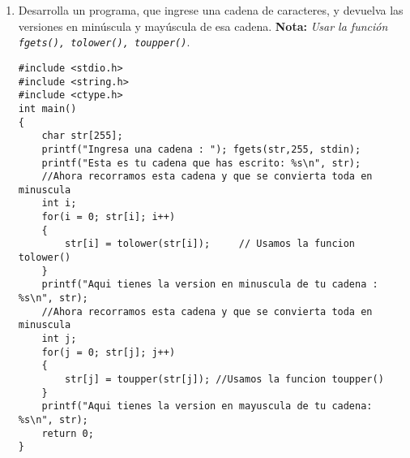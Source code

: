 \documentclass[twoside,10.5pt]{article}%
\begin{document}
\begin{enumerate}
\item Desarrolla un programa, que ingrese una cadena de caracteres, y devuelva las versiones en min\'uscula y may\'uscula de esa cadena. \textbf{Nota:} \textit{Usar la funci\'on \texttt{ fgets(), tolower(), toupper()}}.
\begin{verbatim}
#include <stdio.h>
#include <string.h>
#include <ctype.h>
int main()
{
    char str[255];
    printf("Ingresa una cadena : "); fgets(str,255, stdin);
    printf("Esta es tu cadena que has escrito: %s\n", str);
    //Ahora recorramos esta cadena y que se convierta toda en minuscula
    int i;
    for(i = 0; str[i]; i++)
    {
        str[i] = tolower(str[i]);     // Usamos la funcion tolower()
    }
    printf("Aqui tienes la version en minuscula de tu cadena : %s\n", str);    
    //Ahora recorramos esta cadena y que se convierta toda en minuscula
    int j;
    for(j = 0; str[j]; j++)
    {
        str[j] = toupper(str[j]); //Usamos la funcion toupper()
    }
    printf("Aqui tienes la version en mayuscula de tu cadena: %s\n", str);    
    return 0;
}
\end{verbatim}

\end{enumerate}
\end{document}
